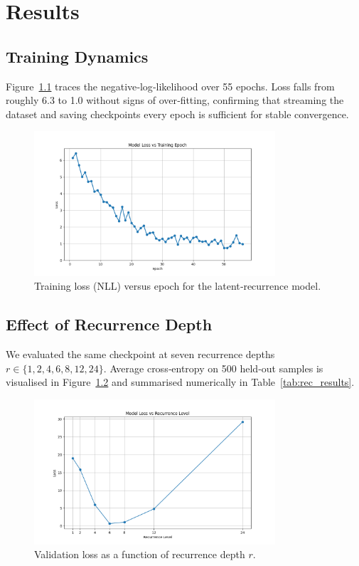 \chapter{Results}\label{ch:results}

\section{Training Dynamics}

Figure~\ref{fig:train_loss} traces the negative‑log‑likelihood over 55
epochs.  Loss falls from roughly 6.3 to 1.0 without signs of over‑fitting,
confirming that streaming the dataset and saving checkpoints every epoch is
sufficient for stable convergence.

\begin{figure}[!ht]
    \centering
    \includegraphics[width=0.8\textwidth]{figs/training_loss_plot.png}
    \caption{Training loss (NLL) versus epoch for the latent‑recurrence model.}
    \label{fig:train_loss}
\end{figure}

\section{Effect of Recurrence Depth}

We evaluated the same checkpoint at seven recurrence depths
\(r\in\{1,2,4,6,8,12,24\}\).
Average cross‑entropy on 500 held‑out samples is visualised in
Figure~\ref{fig:rec_loss} and summarised numerically in
Table~\ref{tab:rec_results}.

\begin{figure}[!ht]
    \centering
    \includegraphics[width=0.8\textwidth]{figs/recurrence_plot.png}
    \caption{Validation loss as a function of recurrence depth \(r\).}
    \label{fig:rec_loss}
\end{figure}


